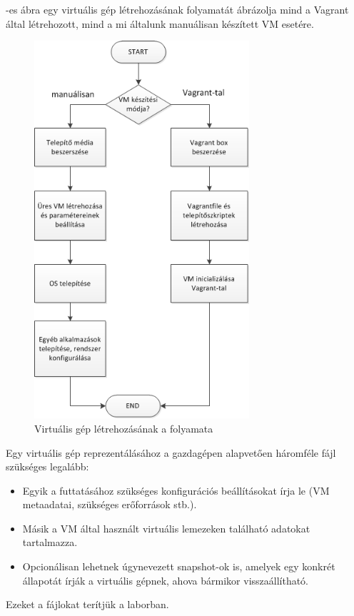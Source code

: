 -es ábra egy virtuális gép létrehozásának folyamatát ábrázolja mind a Vagrant által létrehozott, mind a mi általunk manuálisan készített VM esetére.

\begin{figure}[ht]
	\centering
	\includegraphics[height=140mm, keepaspectratio]{figures/vmcreate.png}
	\caption{Virtuális gép létrehozásának a folyamata}
	\label{fig:vmcreate}
\end{figure}

Egy virtuális gép reprezentálásához a gazdagépen alapvetően háromféle fájl szükséges legalább:

\begin{itemize}
	\item Egyik a futtatásához szükséges konfigurációs beállításokat írja le (VM metaadatai, szükséges erőforrások stb.).
	\item Másik a VM által használt virtuális lemezeken található adatokat tartalmazza.
	\item Opcionálisan lehetnek úgynevezett snapshot-ok is, amelyek egy konkrét állapotát írják a virtuális gépnek, ahova bármikor visszaállítható.
\end{itemize}

Ezeket a fájlokat terítjük a laborban.
